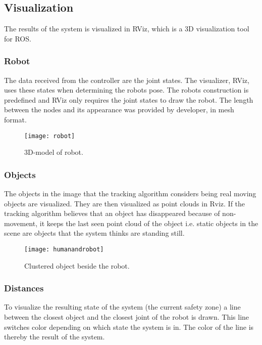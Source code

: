 \subsection{Visualization}

The results of the system is visualized in RViz, which is a 3D visualization tool for ROS. 

\subsubsection{Robot}
The data received from the controller are the joint states.
The visualizer, RViz, uses these states when determining the robots pose.
The robots construction is predefined and RViz only requires the joint states to draw the robot.
The length between the nodes and its appearance was provided by developer, in mesh format.
 
\begin{figure}[H]
\begin{center}
\texttt{[image: robot]}
\caption{3D-model of robot.}

\end{center}
\end{figure}

\subsubsection{Objects}
The objects in the image that the tracking algorithm considers being real moving objects are visualized. They are then visualized as point clouds in Rviz. If the tracking algorithm believes that an object has disappeared because of non-movement, it keeps the last seen point cloud of the object i.e. static objects in the scene are objects that the system thinks are standing still. 

\begin{figure}[H]
\begin{center}
\texttt{[image: humanandrobot]}
\caption{Clustered object beside the robot.}

\end{center}
\end{figure}


\subsubsection{Distances}
To visualize the resulting state of the system (the current safety zone) a line between the closest object and the closest joint of the robot is drawn. This line switches color depending on which state the system is in. The color of the line is thereby the result of the system. 

